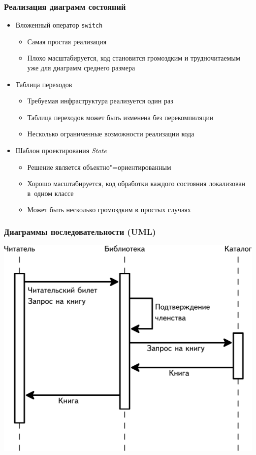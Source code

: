 \documentclass{softengineering-lectures}
\begin{document}
\begin{frame} \frametitle{Реализация диаграмм состояний}
  \begin{itemize}
  \item Вложенный оператор \texttt{switch}
    \begin{itemize}
    \item Самая простая реализация
    \item Плохо масштабируется, код становится громоздким и трудночитаемым уже
      для диаграмм среднего размера
    \end{itemize}
  \item Таблица переходов
    \begin{itemize}
    \item Требуемая инфраструктура реализуется один раз
    \item Таблица переходов может быть изменена без перекомпиляции
    \item Несколько ограниченные возможности реализации кода
    \end{itemize}
  \item Шаблон проектирования \emph{State}
    \begin{itemize}
    \item Решение является объектно"=ориентированным
    \item Хорошо масштабируется, код обработки каждого состояния локализован
      в~одном классе
    \item Может быть несколько громоздким в простых случаях
    \end{itemize}
  \end{itemize}
\end{frame}

\begin{frame} \frametitle{Диаграммы последовательности (UML)}

    \centerline{\includegraphics[height=0.8\textheight]{sequence.pdf}}

\end{frame}
\end{document}
